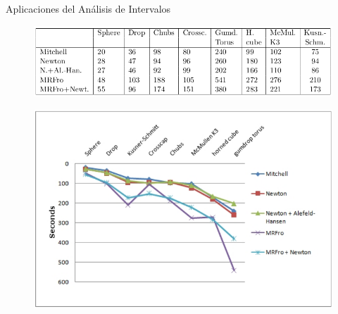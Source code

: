 \documentclass{beamer}
\begin{document}
\begin{frame}{Aplicaciones del Análisis de Intervalos}
\begin{figure}[h]
\centering
\includegraphics[scale=0.3]{images/florez7.png}
\end{figure}
\begin{figure}[h]
\centering
\includegraphics[scale=0.25]{images/florez8.png}
\end{figure}
\end{frame}
\end{document}
